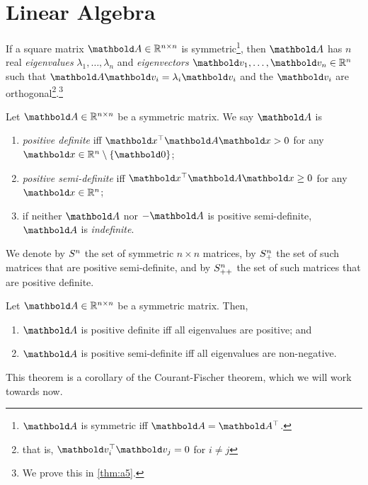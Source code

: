 
\chapter{Linear Algebra}

If a square matrix $\mA \in \R^{n \times n}$ is symmetric\footnote{$\mA$ is symmetric iff $\mA = \trans{\mA}$.}, then $\mA$ has $n$ real \emph{eigenvalues} $\lambda_1, \dots, \lambda_n$ and \emph{eigenvectors} $\vv_1, \dots, \vv_n \in \R^n$ such that $\mA\vv_i = \lambda_i\vv_i$ and the $\vv_i$ are orthogonal\footnote{that is, $\trans{\vv_i}\vv_j = 0$ for $i \neq j$}.\footnote{We prove this in \cref{thm:a5}.}

\begin{defn}
Let $\mA \in \R^{n \times n}$ be a symmetric matrix. We say $\mA$ is \begin{enumerate}
    \item \emph{positive definite} iff $\trans{\vx}\mA\vx > 0$ for any $\vx \in \R^n \setminus \{\vZero\}$;
    \item \emph{positive semi-definite} iff $\trans{\vx}\mA\vx \geq 0$ for any $\vx \in \R^n$;
    \item if neither $\mA$ nor $-\mA$ is positive semi-definite, $\mA$ is \emph{indefinite}.
\end{enumerate}

We denote by $S^n$ the set of symmetric $n \times n$ matrices, by $S_+^n$ the set of such matrices that are positive semi-definite, and by $S_{++}^n$ the set of such matrices that are positive definite.
\end{defn}
\begin{thm}\label{thm:psd_eigenvalues}
Let $\mA \in \R^{n \times n}$ be a symmetric matrix. Then, \begin{enumerate}
    \item $\mA$ is positive definite iff all eigenvalues are positive; and
    \item $\mA$ is positive semi-definite iff all eigenvalues are non-negative.
\end{enumerate}
\end{thm}\noindent This theorem is a corollary of the Courant-Fischer theorem, which we will work towards now.

